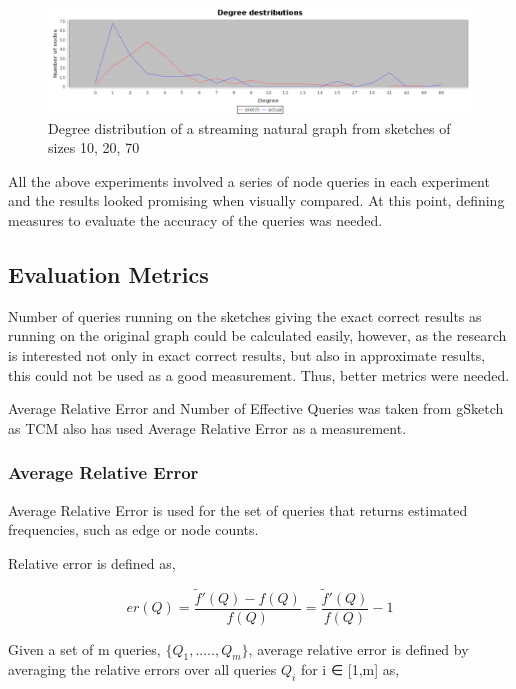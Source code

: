 \documentclass[conference]{IEEEtran}
\begin{document}
\begin{figure}[!t]
\centering
\includegraphics[width=\linewidth]{ddn}
\caption{Degree distribution of a streaming natural graph from sketches of sizes 10, 20, 70}
\label{fig:Degree distribution of a streaming natural graph}
\end{figure}

All the above experiments involved a series of node queries in each experiment and the results looked promising when visually compared. At this point, defining measures to evaluate the accuracy of the queries was needed. 

\subsection{Evaluation Metrics}
Number of queries running on the sketches giving the exact correct results as running on the original graph could be calculated easily, however, as the research is interested not only in exact correct results, but also in approximate results, this could not be used as a good measurement. Thus, better metrics were needed.


Average Relative Error and Number of Effective Queries was taken from gSketch\cite{gSketch} as TCM also has used Average Relative Error as a measurement. 

\subsubsection{Average Relative Error}
Average Relative Error is used for the set of queries that returns estimated frequencies, such as edge or node counts.


Relative error is defined as, 

\begin{equation}
er(Q) =  \frac{\tilde{f}'(Q) - f(Q)}{f(Q)} = \frac{\tilde{f}'(Q)}{f(Q)} -1 
\end{equation}


Given a set of m queries, $\{ Q_1 , ....., Q_m \}$, average relative error is defined by averaging the relative errors over all queries $Q_i$ for i ∈ [1,m] as,
\end{document}
